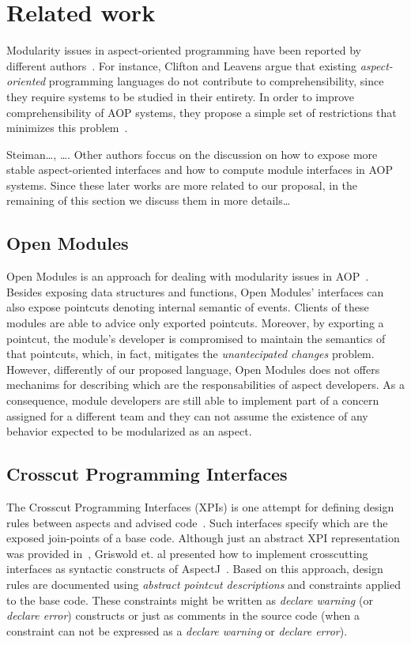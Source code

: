 \section[draft]{Related work}

Modularity issues in aspect-oriented programming have been reported by
different authors~\cite{sullivan-sigsoft-2005, leavens-observers-2002,
steiman-sigplan-2006}. For instance, Clifton and Leavens argue that
existing \emph{aspect-oriented} programming languages do not contribute to
comprehensibility, since they require systems to be studied in their entirety.
In order to improve comprehensibility of AOP systems, they propose a simple set
of restrictions that minimizes this problem~\cite{leavens-observers-2002}.

Steiman\ldots, \ldots . Other authors foccus on the discussion on how to expose
more stable aspect-oriented interfaces and how to compute module interfaces in
AOP systems. Since these later works are more related to our proposal, in the
remaining of this section we discuss them in more details\ldots


\subsection{Open Modules}

Open Modules is an approach for dealing with modularity issues in 
AOP~\cite{aldrich-ecoop-05}. Besides exposing data structures and 
functions, Open Modules' interfaces can also expose pointcuts denoting 
internal semantic of events. Clients of these modules are able to advice 
only exported pointcuts. Moreover, by exporting a pointcut, the module's 
developer is compromised to maintain the semantics of that pointcuts, 
which, in fact, mitigates the \emph{unantecipated changes} problem.
However, differently of our proposed language, Open Modules does not offers
mechanims for describing which are the responsabilities of aspect developers. As
a consequence, module developers are still able to implement part of a concern
assigned for a different team and they can not assume the existence of any
behavior expected to be modularized as an aspect.
 
\subsection{Crosscut Programming Interfaces}

The Crosscut Programming Interfaces (XPIs) is one attempt for defining design
rules between aspects and advised
code~\cite{sullivan-sigsoft-2005,sullivan-ieee-sw-2006}. Such interfaces specify
which are the exposed join-points of a base code. Although just an abstract XPI
representation was provided in~\cite{sullivan-sigsoft-2005}, Griswold et. al
presented how to implement crosscutting interfaces as syntactic constructs of
AspectJ~\citet{sullivan-ieee-sw-2006}. Based on this approach, design rules are
documented using \emph{abstract pointcut descriptions} and constraints applied to
the base code. These constraints might be written as \emph{declare warning} (or
\emph{declare error}) constructs or just as comments in the source code (when a
constraint can not be expressed as a \emph{declare warning} or \emph{declare
error}). 

